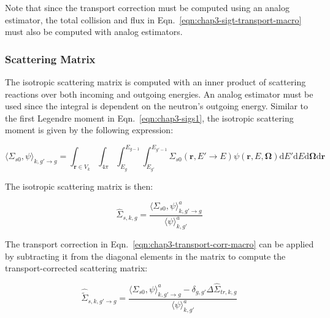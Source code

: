 \noindent Note that since the transport correction must be computed using an analog estimator, the total collision and flux in Eqn.~\ref{eqn:chap3-sigt-transport-macro} must also be computed with analog estimators.


\subsubsection{Scattering Matrix}
\label{subsubsec:chap3-tally-types-scatt-mat}

The isotropic scattering matrix is computed with an inner product of scattering reactions over both incoming and outgoing energies. An analog estimator must be used since the integral is dependent on the neutron's outgoing energy. Similar to the first Legendre moment in Eqn.~\ref{eqn:chap3-sigs1}, the isotropic scattering moment is given by the following expression:

\begin{equation}
\label{eqn:chap3-sigs0}
\langle \Sigma_{s0}, \psi \rangle_{k,g'\rightarrow g} = \int_{\mathbf{r} \in V_{k}} \int_{4\pi} \int_{E_{g}}^{E_{g-1}} \int_{E_{g'}}^{E_{g'-1}} \Sigma_{s0}(\mathbf{r},E'\rightarrow E)\psi(\mathbf{r},E,\mathbf{\Omega}) \mathrm{d}E'\mathrm{d}E\mathrm{d}\mathbf{\Omega}\mathrm{d}\mathbf{r}
\end{equation}

\noindent The isotropic scattering matrix is then:

\begin{equation}
\label{eqn:chap3-scatter-macro}
\hat{\Sigma}_{s,k,g} = \frac{\langle \Sigma_{s0}, \psi \rangle_{k,g'\rightarrow g}^{a}}{\langle \psi \rangle_{k,g'}^{a}}
\end{equation}

\noindent The transport correction in Eqn.~\ref{eqn:chap3-transport-corr-macro} can be applied by subtracting it from the diagonal elements in the matrix to compute the transport-corrected scattering matrix:

\begin{equation}
\label{eqn:chap3-scatter-trans-macro}
\hat{\tilde{\Sigma}}_{s,k,g'\rightarrow g} = \frac{\langle \Sigma_{s0}, \psi \rangle_{k,g'\rightarrow g}^{a} - \delta_{g,g'} \Delta\hat{\Sigma}_{tr,k,g}}{\langle \psi \rangle_{k,g'}^{a}}
\end{equation}



